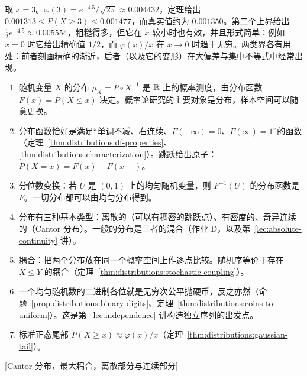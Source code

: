 \begin{example}
取 $x=3$。$\varphi(3)=e^{-4.5}/\sqrt{2\pi}\approx0.004432$，定理给出 $0.001313\leqslant P(X\geqslant3)\leqslant0.001477$，而真实值约为 $0.001350$。第二个上界给出 $\frac12e^{-4.5}\approx0.005554$，粗糙得多，但它在 $x$ 较小时也有效，并且形式简单：例如 $x=0$ 时它给出精确值 $1/2$，而 $\varphi(x)/x$ 在 $x\to0$ 时趋于无穷。两类界各有用处：前者刻画精确的渐近，后者（以及它的变形）在大偏差与集中不等式中经常出现。
\end{example}


\begin{enumerate}
\item 随机变量 $X$ 的分布 $\mu_X=P\circ X^{-1}$ 是 $\mathbb{R}$ 上的概率测度，由分布函数 $F(x)=P(X\leqslant x)$ 决定。概率论研究的主要对象是分布，样本空间可以随意更换。
\item 分布函数恰好是满足“单调不减、右连续、$F(-\infty)=0$、$F(\infty)=1$”的函数（定理~\ref{thm:distributions:df-properties}、\ref{thm:distributions:characterization}）。跳跃给出原子：$P(X=x)=F(x)-F(x-)$。
\item 分位数变换：若 $U$ 是 $(0,1)$ 上的均匀随机变量，则 $F^{-1}(U)$ 的分布函数是 $F$。一切分布都可以由均匀分布得到。
\item 分布有三种基本类型：离散的（可以有稠密的跳跃点）、有密度的、奇异连续的（Cantor 分布）。一般的分布是三者的混合（作业 D，以及第~\ref{lec:absolute-continuity} 讲）。
\item 耦合：把两个分布放在同一个概率空间上作逐点比较。随机序等价于存在 $X\leqslant Y$ 的耦合（定理~\ref{thm:distributions:stochastic-coupling}）。
\item 一个均匀随机数的二进制各位就是无穷次公平抛硬币，反之亦然（命题~\ref{prop:distributions:binary-digits}、定理~\ref{thm:distributions:coins-to-uniform}）。这是第~\ref{lec:independence} 讲构造独立序列的出发点。
\item 标准正态尾部 $P(X\geqslant x)\approx\varphi(x)/x$（定理~\ref{thm:distributions:gaussian-tail}）。
\end{enumerate}

[Cantor 分布，最大耦合，离散部分与连续部分]
\label{hw:distributions}


